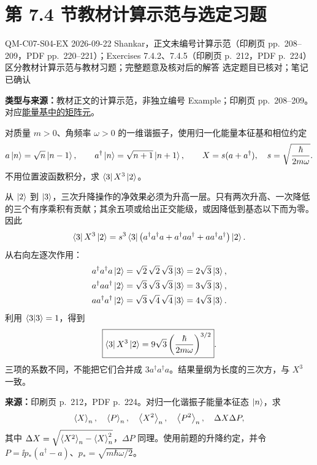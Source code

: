 \section{第 7.4 节教材计算示范与选定习题}
\label{exercise-set:QM-C07-S04}
\exercisemeta
  {QM-C07-S04-EX}
  {2026-09-22}
  {Shankar，正文未编号计算示范（印刷页 pp.~208--209，PDF pp.~220--221）；Exercises 7.4.2、7.4.5（印刷页 p.~212，PDF p.~224）}
  {区分教材计算示范与教材习题；完整题意及核对后的解答}
  {选定题目已核对；笔记已确认}

\textbf{类型与来源：}教材正文的计算示范，非独立编号 Example；印刷页 pp.~208--209。对应\hyperref[topic:QM-C07-S04-T03]{能量基中的矩阵元}。

对质量 $m>0$、角频率 $\omega>0$ 的一维谐振子，使用归一化能量本征基和相位约定
\begin{equation}
  a\left|n\right\rangle=\sqrt n\left|n-1\right\rangle,\qquad
  a^\dagger\left|n\right\rangle=\sqrt{n+1}\left|n+1\right\rangle,\qquad
  X=s(a+a^\dagger),\quad s=\sqrt{\frac{\hbar}{2m\omega}}.
\end{equation}
不用位置波函数积分，求 $\left\langle 3\right| X^3\left|2\right\rangle$。

\begin{checkedsolution}
从 $\left|2\right\rangle$ 到 $\left|3\right\rangle$，三次升降操作的净效果必须为升高一层。只有两次升高、一次降低的三个有序乘积有贡献；其余五项或给出正交能级，或因降低到基态以下而为零。因此
\begin{equation}
  \left\langle 3\right| X^3\left|2\right\rangle=s^3\left\langle 3\right|
  \bigl(a^\dagger a^\dagger a+a^\dagger aa^\dagger+aa^\dagger a^\dagger\bigr)\left|2\right\rangle.
\end{equation}
从右向左逐次作用：
\begin{align}
  a^\dagger a^\dagger a\left|2\right\rangle
    &=\sqrt2\,\sqrt2\,\sqrt3\left|3\right\rangle=2\sqrt3\left|3\right\rangle,\\
  a^\dagger aa^\dagger\left|2\right\rangle
    &=\sqrt3\,\sqrt3\,\sqrt3\left|3\right\rangle=3\sqrt3\left|3\right\rangle,\\
  aa^\dagger a^\dagger\left|2\right\rangle
    &=\sqrt3\,\sqrt4\,\sqrt4\left|3\right\rangle=4\sqrt3\left|3\right\rangle.
\end{align}
利用 $\left\langle 3 \middle| 3 \right\rangle=1$，得到
\begin{equation}
  \boxed{\left\langle 3\right| X^3\left|2\right\rangle
    =9\sqrt3\left(\frac{\hbar}{2m\omega}\right)^{3/2}}.
\end{equation}
三项的系数不同，不能把它们合并成 $3a^\dagger a^\dagger a$。结果量纲为长度的三次方，与 $X^3$ 一致。
\end{checkedsolution}

\textbf{来源：}印刷页 p.~212，PDF p.~224。对归一化谐振子能量本征态 $\left|n\right\rangle$，求
\begin{equation}
  \left\langle X \right\rangle_n,\quad\left\langle P \right\rangle_n,\quad
  \left\langle X^2 \right\rangle_n,\quad\left\langle P^2 \right\rangle_n,\quad\Delta X\Delta P,
\end{equation}
其中 $\Delta X=\sqrt{\left\langle X^2 \right\rangle_n-\left\langle X \right\rangle_n^2}$，$\Delta P$ 同理。使用前题的升降约定，并令 $P=\ii p_*(a^\dagger-a)$、$p_*=\sqrt{m\hbar\omega/2}$。

